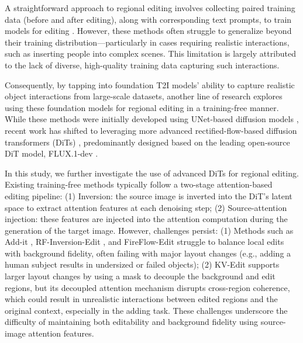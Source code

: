 \documentclass{article}
\begin{document}
A straightforward approach to regional editing involves collecting paired training data (before and after editing), along with corresponding text prompts, to train models for editing \citep{brooks2023instructpix2pix, zhang2023magicbrush, wasserman2024paint, li2024brushedit, hui2024hq, wei2024omniedit}. However, these methods often struggle to generalize beyond their training distribution—particularly in cases requiring realistic interactions, such as inserting people into complex scenes. This limitation is largely attributed to the lack of diverse, high-quality training data capturing such interactions.

Consequently, by tapping into foundation T2I models’ ability to capture realistic object interactions from large-scale datasets, another line of research explores using these foundation models for regional editing in a training-free manner. While these methods were initially developed using UNet-based diffusion models \citep{hertz2022prompt, cao2023masactrl, tumanyan2023plug}, recent work has shifted to leveraging more advanced rectified-flow-based diffusion transformers (DiTs) \citep{rout2024semantic, wang2024taming, deng2024fireflow, tewel2025addit, zhu2025kv}, predominantly designed based on the leading open-source DiT model, FLUX.1-dev \citep{blackforest2024flux}.




In this study, we further investigate the use of advanced DiTs for regional editing. Existing training-free methods typically follow a two-stage attention-based editing pipeline: (1) Inversion: the source image is inverted into the DiT’s latent space to extract attention features at each denoising step; (2) Source-attention injection: these features are injected into the attention computation during the generation of the target image. However, challenges persist: (1) Methods such as Add-it \citep{tewel2025addit}, RF-Inversion-Edit \citep{rout2024semantic}, and FireFlow-Edit \citep{deng2024fireflow} struggle to balance local edits with background fidelity, often failing with major layout changes (e.g., adding a human subject results in undersized or failed objects); (2) KV-Edit \citep{zhu2025kv} supports larger layout changes by using a mask to decouple the background and edit regions, but its decoupled attention mechanism disrupts cross-region coherence, which could result in unrealistic interactions between edited regions and the original context, especially in the adding task. These challenges underscore the difficulty of maintaining both editability and background fidelity using source-image attention features.
\end{document}
